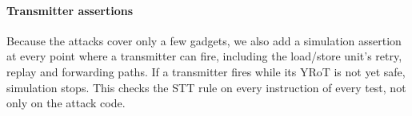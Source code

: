 
\paragraph{Transmitter assertions}
Because the attacks cover only a few gadgets, 
we also add a simulation assertion at every point where a transmitter can fire, 
including the load/store unit's retry, replay and forwarding paths. If a transmitter 
fires while its YRoT is not yet safe, simulation stops. This checks the STT rule on every 
instruction of every test, not only on the attack code.
